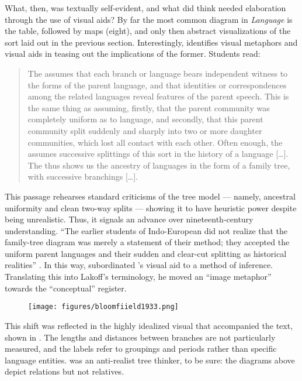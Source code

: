 \documentclass[output=paper]{langscibook}
\begin{document}
What, then, was textually self-evident, and what did {\Bloomfield} think needed elaboration through the use of visual aids? By far the most common diagram in \emph{Language} is the table, followed by maps (eight), and only then abstract visualizations of the sort laid out in the previous section. Interestingly, {\Bloomfield} identifies visual metaphors and visual aids in teasing out the implications of the former. Students read:

\begin{quotation}
The  assumes that each branch or language bears independent witness to the forms of the parent language, and that identities or correspondences among the related languages reveal features of the parent speech. This is the same thing as assuming, firstly, that the parent community was completely uniform as to language, and secondly, that this parent community split suddenly and sharply into two or more daughter communities, which lost all contact with each other. Often enough, the  assumes successive splittings of this sort in the history of a language […]. The  thus shows us the ancestry of languages in the form of a family tree, with successive branchings […]. \citep[311]{Bloomfield1933}
\end{quotation}

This passage rehearses standard criticisms of the tree model — namely, ancestral uniformity and clean two-way splits — showing it to have heuristic power despite being unrealistic. Thus, it signals an advance over nineteenth-century understanding. ``The earlier students of Indo-European did not realize that the family-tree diagram was merely a statement of their method; they accepted the uniform parent languages and their sudden and clear-cut splitting as historical realities'' \citep[311]{Bloomfield1933}. In this way, {\Bloomfield} subordinated {\Schleicher}'s visual aid to a method of inference. Translating this into Lakoff's terminology, he moved an ``image metaphor'' towards the ``conceptual'' register.

\begin{figure}
    \centering
    \texttt{[image: figures/bloomfiield1933.png]}
    \caption{\citet[312]{Bloomfield1933}}
    \label{fig:kaplan:bloomfield}
\end{figure}

This shift was reflected in the highly idealized visual that accompanied the text, shown in . The lengths and distances between branches are not particularly measured, and the labels refer to groupings and periods rather than specific language entities. {\Bloomfield} was an anti-realist tree thinker, to be sure: the diagrams above depict relations but not relatives.
\end{document}
